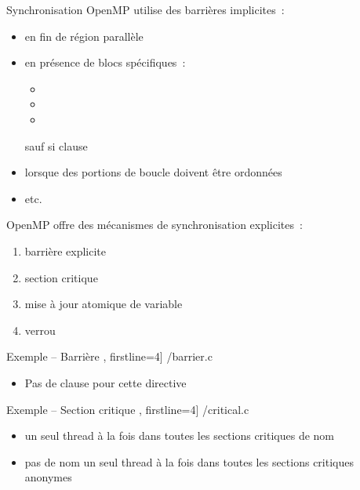 

\begin {frame} {Synchronisation}
    OpenMP utilise des barrières implicites~:
    \begin {itemize}
	\item en fin de région parallèle
	\item en présence de blocs spécifiques~:
	    \begin {itemize}
		\item {}
		\item {}
		\item {}
	    \end {itemize}
	    \implique sauf si clause 
	\item lorsque des portions de boucle doivent être ordonnées
	\item etc.
    \end {itemize}

    OpenMP offre des mécanismes de synchronisation explicites~:
    \begin {enumerate}
	\item barrière explicite
	\item section critique
	\item mise à jour atomique de variable
	\item verrou
    \end {enumerate}
\end {frame}


\begin {frame} [fragile] {Exemple \theompexemple{} -- Barrière}
    \scriptsize\lstmonstyle, firstline=4] {\inc/barrier.c}

    \begin {itemize}
	\item Pas de clause pour cette directive

    \end {itemize}
\end{frame}



\begin {frame} [fragile] {Exemple \theompexemple{} -- Section critique}
    \scriptsize\lstmonstyle, firstline=4] {\inc/critical.c}

    \begin {itemize}
	\item un seul thread à la fois dans toutes les sections
	    critiques de nom 

	\item pas de nom \implique un seul thread à la fois
	    dans toutes les sections critiques anonymes

    \end {itemize}
\end{frame}


